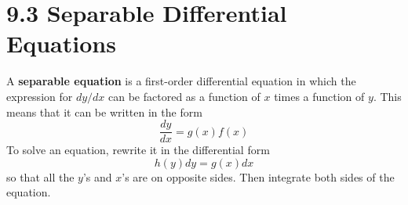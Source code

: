 %
%

\section*{9.3 Separable Differential Equations}

A \textbf{separable equation} is a first-order differential equation in which the expression for \(dy/dx\) can be factored as a function of \(x\) times a function of \(y\). This means that it can be written in the form
\[ \frac{dy}{dx} = g(x)f(x) \]
To solve an equation, rewrite it in the differential form
\[ h(y)dy = g(x)dx \]
so that all the \(y\)'s and \(x\)'s are on opposite sides. Then integrate both sides of the equation.
